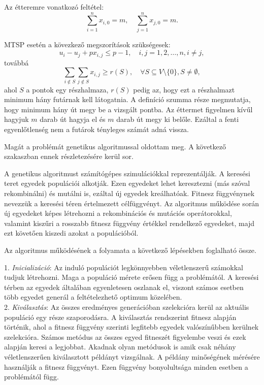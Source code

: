 Az étteremre vonatkozó feltétel:
\[
\displaystyle
\sum_{i=1}^n x_{i, 0} = m, \quad
\sum_{j=1}^n x_{j, 0} = m.
\]

MTSP esetén a kövezkező megszorítások szükségesek:
\[
u_i - u_j + p x_{i,j} \leq p - 1, \quad i, j = 1, 2, \ldots, n, i \neq j,
\]
továbbá
\[
\displaystyle
\sum_{i \notin S} \sum_{j \notin S} x_{i,j} \geq r(S), \quad
\forall S \subseteq V \setminus \{0\}, S \neq \emptyset,
\]
ahol $S$ a pontok egy részhalmaza, $r(S)$ pedig az, hogy ezt a részhalmazt minimum hány futárnak kell látogatnia. A definíció szumma része megmutatja, hogy minimum hány út megy be a vizsgált pontba. Az éttermet figyelmen kívűl hagyjuk $m$ darab út hagyja el és $m$ darab út megy ki belőle. Ezáltal a fenti egyenlőtlenség nem a futárok tényleges számát adná vissza.

Magát a problémát genetikus algoritmussal oldottam meg. A következő szakaszban ennek részletezésére kerül sor.


A genetikus algoritmust számítógépes szimulációkkal reprezentálják. A keresési teret egyedek populációi alkotják. Ezen egyedeket lehet keresztezni (más szóval rekombinálni) és mutálni is, ezáltal új egyedek kreálhatóak. Fitnesz függvénynek nevezzük a keresési téren értelmezett célfüggvényt. Az algoritmus működése során új egyedeket képes létrehozni a rekombinációs és mutációs operátorokkal, valamint kiszűri a rosszabb fitnesz függvény értékkel rendelkező egyedeket, majd ezt követően kiszedi azokat a populációból.

Az algoritmus működésének a folyamata a következő lépésekben foglalható össze.

1. \textit{Inicializáció}:  Az induló populációt legkönnyebben véletlenszerű számokkal tudjuk létrehozni. Maga a populáció mérete erősen függ a problémától. A keresési térben az egyedek általában egyenletesen oszlanak el, viszont számos esetben több egyedet generál a feltételezhető optimum közelében. \\

2. \textit{Kiválasztás}: Az összes eredményes generációban szelekcióra kerül az aktuális populáció egy része szaporodásra. A kiválasztás rendszerint fitnesz alapján történik, ahol a fitnesz függvény szerinti legfitebb egyedek valószínűbben kerülnek szelekcióra. Számos metódus az összes egyed fitneszét figyelembe veszi és ezek alapján keresi a legjobbat. Akadnak olyan metódusok is amik csak néhány véletlenszerűen kiválasztott példányt vizsgálnak. A példány minőségének mérésére használják a fitnesz függvényt. Ezen függvény bonyolultsága minden esetben a problémától függ. \\

